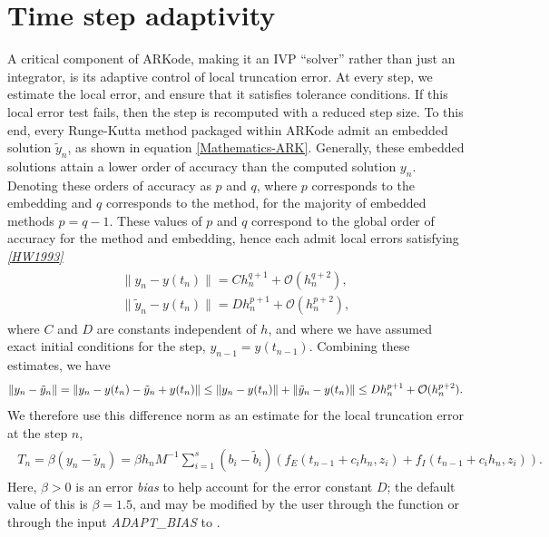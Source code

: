 \documentclass[letterpaper,10pt,english]{sphinxmanual}
\begin{document}
\section{Time step adaptivity}
\label{Mathematics:time-step-adaptivity}\label{Mathematics:mathematics-adaptivity}
A critical component of ARKode, making it an IVP ``solver'' rather than
just an integrator, is its adaptive control of local truncation error.
At every step, we estimate the local error, and ensure that it
satisfies tolerance conditions.  If this local error test fails, then
the step is recomputed with a reduced step size.  To this end, every
Runge-Kutta method packaged within ARKode admit an embedded solution
\(\tilde{y}_n\), as shown in equation \eqref{Mathematics-ARK}. Generally, these
embedded solutions attain a lower order of accuracy than the computed
solution \(y_n\).  Denoting these orders of accuracy as \(p\)
and \(q\), where \(p\) corresponds to the embedding and
\(q\) corresponds to the method, for the majority of embedded
methods \(p = q-1\).  These values of \(p\) and \(q\)
correspond to the global order of accuracy for the method and
embedding, hence each admit local errors satisfying \label{Mathematics:id7}{\hyperref[References:hw1993]{\emph{{[}HW1993{]}}}}
\label{Mathematics:equation-AsymptoticErrors}\begin{gather}
\begin{split}\| y_n - y(t_n) \| = C h_n^{q+1} + \mathcal O(h_n^{q+2}), \\
\| \tilde{y}_n - y(t_n) \| = D h_n^{p+1} + \mathcal O(h_n^{p+2}),\end{split}\label{Mathematics-AsymptoticErrors}
\end{gather}
where \(C\) and \(D\) are constants independent of \(h\),
and where we have assumed exact initial conditions for the step,
\(y_{n-1} = y(t_{n-1})\). Combining these estimates, we have
\begin{gather}
\begin{split}\| y_n - \tilde{y}_n \| = \| y_n - y(t_n) - \tilde{y}_n + y(t_n) \|
\le \| y_n - y(t_n) \| + \| \tilde{y}_n - y(t_n) \|
\le D h_n^{p+1} + \mathcal O(h_n^{p+2}).\end{split}\notag
\end{gather}
We therefore use this difference norm as an estimate for the local
truncation error at the step \(n\),
\label{Mathematics:equation-LTE}\begin{gather}
\begin{split}T_n = \beta \left(y_n - \tilde{y}_n\right) =
\beta h_n M^{-1} \sum_{i=1}^{s} \left(b_i - \tilde{b}_i\right)
\left(f_E(t_{n-1} + c_i h_n, z_i) + f_I(t_{n-1} + c_i h_n, z_i)\right).\end{split}\label{Mathematics-LTE}
\end{gather}
Here, \(\beta>0\) is an error \emph{bias} to help account for the error
constant \(D\); the default value of this is \(\beta = 1.5\),
and may be modified by the user through the function
{\hyperref[c_interface/User_callable:c.ARKodeSetErrorBias]{\emph{}}} or through the input \emph{ADAPT\_BIAS} to
{\hyperref[f_interface/Usage:f/_/FARKSETRIN]{\emph{}}}.
\end{document}
